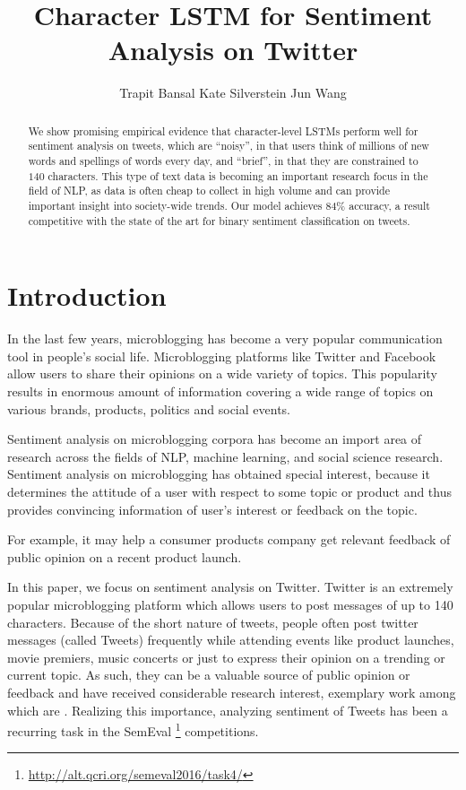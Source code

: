 \documentclass{article} %
\title{Character LSTM for Sentiment Analysis on Twitter}
\author{
Trapit Bansal
\And
Kate Silverstein
\And
Jun Wang
}
\begin{document}
\maketitle

\begin{abstract}
We show promising empirical evidence that character-level LSTMs perform well for sentiment analysis on tweets, which are ``noisy'', in that users think of millions of new words and spellings of words every day, and ``brief'', in that they are constrained to $140$ characters. This type of text data is becoming an important research focus in the field of NLP, as data is often cheap to collect in high volume and can provide important insight into society-wide trends. Our model achieves $84 \%$ accuracy, a result competitive with the state of the art for binary sentiment classification on tweets.
\end{abstract}

\section{Introduction}
In the last few years, microblogging has become a very popular communication tool in people's social life. Microblogging platforms like Twitter and Facebook allow users to share their opinions on a wide variety of topics. This popularity results in enormous amount of information covering a wide range of topics on various brands, products, politics and social events. 

Sentiment analysis on microblogging corpora has become an import area of research across the fields of NLP, machine learning, and social science research. 
Sentiment analysis on microblogging has obtained special interest, because it determines the attitude of a user with respect to some topic or product and thus provides convincing information of user's interest or feedback on the topic.

For example, it may help a consumer products company get relevant feedback of public opinion on a recent product launch.  

In this paper, we focus on sentiment analysis on Twitter. 
Twitter is an extremely popular microblogging platform which allows users to post messages of up to 140 characters.
Because of the short nature of tweets, people often post twitter messages (called Tweets) frequently while attending events like product launches, movie premiers, music concerts or just to express their opinion on a trending or current topic.
As such, they can be a valuable source of public opinion or feedback and have received considerable research interest, exemplary work among which are \cite{o2010tweets, bollen2011twitter, bollen2009modeling}.
Realizing this importance, analyzing sentiment of Tweets has been a recurring task in the SemEval \footnote{\url{http://alt.qcri.org/semeval2016/task4/}} competitions.
\end{document}
